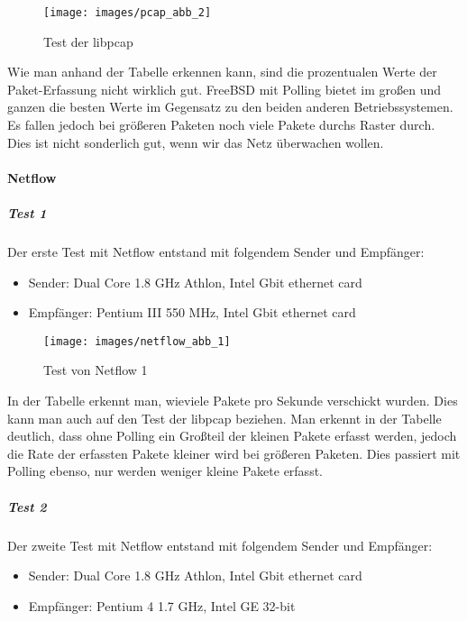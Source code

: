 \begin{figure}
  \centering
  \texttt{[image: images/pcap\_abb\_2]}
  \caption{Test der libpcap}
  \label{fig:netflow-security:test-libpcap}
\end{figure}

Wie man anhand der Tabelle erkennen kann, sind die prozentualen Werte
der Paket-Erfassung nicht wirklich gut. FreeBSD mit Polling bietet im
großen und ganzen die besten Werte im Gegensatz zu den beiden anderen
Betriebssystemen. Es fallen jedoch bei größeren Paketen noch viele
Pakete durchs Raster durch. Dies ist nicht sonderlich gut, wenn wir das
Netz überwachen wollen.

\paragraph{Netflow}

\subparagraph{Test 1}

Der erste Test mit Netflow entstand mit folgendem Sender und Empfänger:

\begin{itemize}
 \item Sender: Dual Core 1.8 GHz Athlon, Intel Gbit ethernet card
 \item Empfänger: Pentium III 550 MHz, Intel Gbit ethernet card
\end{itemize}

\begin{figure}
  \centering
  \texttt{[image: images/netflow\_abb\_1]}
  \caption{Test von Netflow 1}
  \label{fig:netflow-security:test-netflow-1}
\end{figure}

In der Tabelle erkennt man, wieviele Pakete pro Sekunde verschickt
wurden. Dies kann man auch auf den Test der libpcap beziehen. Man erkennt
in der Tabelle deutlich, dass ohne Polling ein Großteil der kleinen
Pakete erfasst werden, jedoch die Rate der erfassten Pakete kleiner wird
bei größeren Paketen. Dies passiert mit Polling ebenso, nur werden
weniger kleine Pakete erfasst.

\subparagraph{Test 2}

Der zweite Test mit Netflow entstand mit folgendem Sender und Empfänger:

\begin{itemize}
  \item Sender: Dual Core 1.8 GHz Athlon, Intel Gbit ethernet card
  \item Empfänger: Pentium 4 1.7 GHz, Intel GE 32-bit
\end{itemize}

